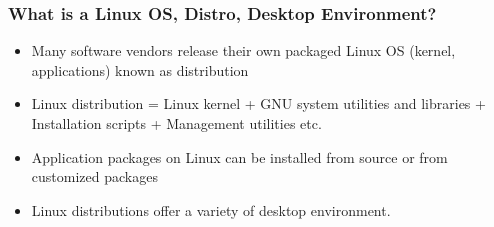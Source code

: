 \documentclass[10pt,t]{beamer}
\begin{document}
\begin{frame}
  \frametitle{What is a Linux OS, Distro, Desktop Environment?}
  \begin{itemize}
    \item Many software vendors release their own packaged Linux OS (kernel, applications) known as distribution
    \item Linux distribution = Linux kernel + GNU system utilities and libraries + Installation scripts + Management utilities etc.
    \item Application packages on Linux can be installed from source or from customized packages
    \item Linux distributions offer a variety of desktop environment.
  \end{itemize}
\end{frame}
\end{document}
